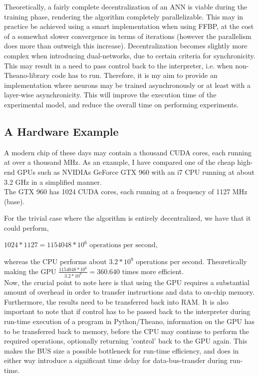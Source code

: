 Theoretically, a fairly complete decentralization of an ANN is viable during the training phase, rendering the algorithm completely parallelizable. This may in practice be achieved using a smart implementation when using FFBP, at the cost of a somewhat slower convergence in terms of iterations (however the parallelism does more than outweigh this increase). Decentralization becomes slightly more complex when introducing dual-networks, due to certain criteria for synchronicity. This may result in a need to pass control back to the interpreter, i.e. when non-Theano-library code has to run. Therefore, it is my aim to provide an implementation where neurons may be trained asynchronously or at least with a layer-wise asynchronicity. This will improve the execution time of the experimental model, and reduce the overall time on performing experiments.

\subsection{A Hardware Example}
A modern chip of these days may contain a thousand CUDA cores, each running at over a thousand MHz. As an example, I have compared one of the cheap high-end GPUs such as NVIDIAs GeForce GTX 960 with an i7 CPU running at about 3.2 GHz in a simplified manner.
\\
The GTX 960 has 1024 CUDA cores, each running at a frequency of 1127 MHz (base).

For the trivial case where the algorithm is entirely decentralized, we have that it could perform,

\begin{center}
\begin{math}
    1024 * 1127 = 1 154 048 * 10^6 \text{ operations per second},
\end{math}
\end{center}
whereas the CPU performs about $3.2 * 10^9$ operations per second.
Theoretically making the GPU $\frac{1154048*10^6}{3.2*10^9} = 360.640$ times more efficient.
\\
Now, the crucial point to note here is that using the GPU requires a substantial amount of overhead in order to transfer instructions and data to on-chip memory. Furthermore, the results need to be transferred back into RAM. It is also important to note that if control has to be passed back to the interpreter during run-time execution of a program in Python/Theano, information on the GPU has to be transferred back to memory, before the CPU may continue to perform the required operations, optionally returning 'control' back to the GPU again. This makes the BUS size a possible bottleneck for run-time efficiency, and does in either way introduce a significant time delay for data-bus-transfer during run-time.

